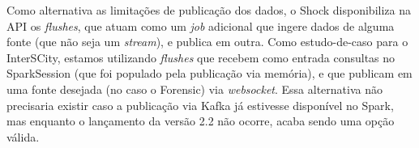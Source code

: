 

Como alternativa as limitações de publicação dos dados, o Shock disponibiliza
na API os \textit{flushes}, que atuam como um \textit{job} adicional que ingere
dados de alguma fonte (que não seja um \textit{stream}), e publica em outra.
Como estudo-de-caso para o InterSCity, estamos utilizando \textit{flushes} que
recebem como entrada consultas no SparkSession (que foi populado pela
publicação via memória), e que publicam em uma fonte desejada (no caso o
Forensic) via \textit{websocket}. Essa alternativa não precisaria existir caso
a publicação via Kafka já estivesse disponível no Spark, mas enquanto o
lançamento da versão 2.2 não ocorre, acaba sendo uma opção válida.

